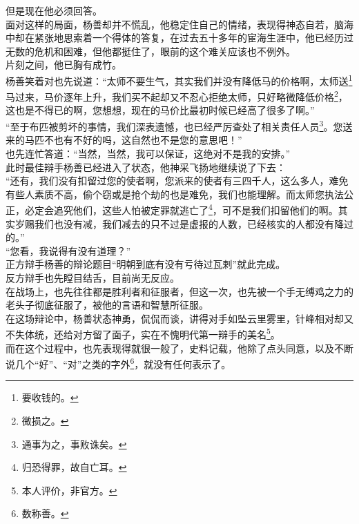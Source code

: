 \begin{multicols}{\theparacolNo}
但是现在他必须回答。\\

面对这样的局面，杨善却并不慌乱，他稳定住自己的情绪，表现得神态自若，脑海中却在紧张地思索着一个得体的答复，在过去五十多年的宦海生涯中，他已经历过无数的危机和困难，但他都挺住了，眼前的这个难关应该也不例外。\\

片刻之间，他已胸有成竹。\\

杨善笑着对也先说道：“太师不要生气，其实我们并没有降低马的价格啊，太师送\footnote{要收钱的。}马过来，马价逐年上升，我们买不起却又不忍心拒绝太师，只好略微降低价格\footnote{微损之。}，这也是不得已的啊，您想想，现在的马价比最初时候已经高了很多了啊。”\\

“至于布匹被剪坏的事情，我们深表遗憾，也已经严厉查处了相关责任人员\footnote{通事为之，事败诛矣。}。您送来的马匹不也有不好的吗，这自然也不是您的意思吧！”\\

也先连忙答道：“当然，当然，我可以保证，这绝对不是我的安排。”\\

此时最佳辩手杨善已经进入了状态，他神采飞扬地继续说了下去：\\

“还有，我们没有扣留过您的使者啊，您派来的使者有三四千人，这么多人，难免有些人素质不高，偷个窃或是抢个劫的也是难免，我们也能理解。而太师您执法公正，必定会追究他们，这些人怕被定罪就逃亡了\footnote{归恐得罪，故自亡耳。}，可不是我们扣留他们的啊。其实岁赐我们也没有减，我们减去的只不过是虚报的人数，已经核实的人都没有降过的。”\\

“您看，我说得有没有道理？”\\

正方辩手杨善的辩论题目“明朝到底有没有亏待过瓦剌”就此完成。\\

反方辩手也先瞠目结舌，目前尚无反应。\\

在战场上，也先往往都是胜利者和征服者，但这一次，也先被一个手无缚鸡之力的老头子彻底征服了，被他的言语和智慧所征服。\\

在这场辩论中，杨善状态神勇，侃侃而谈，讲得对手如坠云里雾里，针峰相对却又不失体统，还给对方留了面子，实在不愧明代第一辩手的美名\footnote{本人评价，非官方。}。\\

而在这个过程中，也先表现得就很一般了，史料记载，他除了点头同意，以及不断说几个“好”、“对”之类的字外\footnote{数称善。}，就没有任何表示了。\\


\end{multicols}
